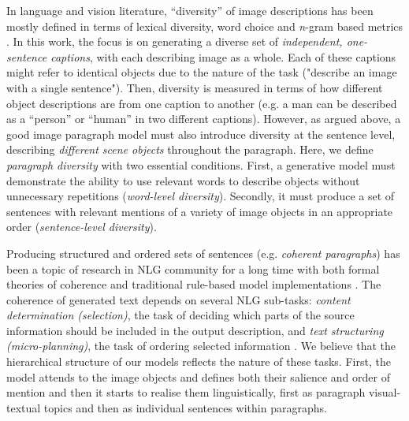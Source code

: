 \documentclass[11pt,a4paper]{article}
\newcommand{\kibitz}[2]{\ifnum\Comments=1\textcolor{#1}{#2}\fi}
\newcommand{\nikolai}[1]{\kibitz{red}  {[Nikolai: #1]}}
\begin{document}
In language and vision literature, ``diversity'' of image descriptions has been mostly defined in terms of lexical diversity, word choice and \textit{n}-gram based metrics \cite{Devlin2015, Vijayakumar2016, Lindh2018, VanMiltenburg2018}.
In this work, the focus is on generating a diverse set of \textit{independent, one-sentence captions}, with each describing image as a whole.
Each of these captions might refer to identical objects due to the nature of the task ("describe an image with a single sentence").
Then, diversity is measured in terms of how different object descriptions are from one caption to another (e.g. a man can be described as a ``person'' or ``human'' in two different captions).
However, as argued above, a good image paragraph model must also introduce diversity at the sentence level, describing \textit{different scene objects} throughout the paragraph. %
Here, we define \textit{paragraph diversity} with two essential conditions.
First, a generative model must demonstrate the ability to use %
relevant words to describe objects without unnecessary repetitions (\emph{word-level diversity}).
Secondly, it must produce a set of sentences with relevant mentions of a variety of image objects in an appropriate order (\emph{sentence-level diversity}).


Producing structured and ordered sets of sentences (e.g. \textit{coherent paragraphs}) has been a topic of research in NLG community for a long time with both formal theories of coherence \cite{grosz95,Barzilay2008} and traditional rule-based model implementations \cite{Reiter00buildingnatural,Deemter:2016aa}.
The coherence of generated text depends on several NLG sub-tasks: \textit{content determination (selection)}, the task of deciding which parts of the source information should be included in the output description, and \textit{text structuring (micro-planning)}, the task of ordering selected information \cite{Gatt2017}.
We believe that the hierarchical structure of our models reflects the nature of these tasks. First, the model attends to the image objects and defines both their salience and order of mention and then it starts to realise them linguistically, first as paragraph visual-textual topics and then as individual sentences within paragraphs.
\end{document}
